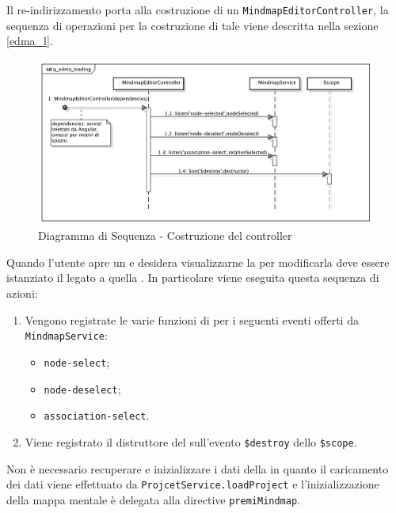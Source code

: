 Il re-indirizzamento porta alla costruzione di un \texttt{MindmapEditorController}, la sequenza di operazioni per la costruzione di tale  viene descritta nella sezione \ref{edma_l}.
\label{edma_l}
\begin{center}
\begin{figure}[h]
\centering
\includegraphics[scale=0.25,keepaspectratio]{diagrammi/sequenza/FrontEnd/controllers/q_edma_loading.pdf}
\caption{Diagramma di Sequenza - Costruzione del controller}
\end{figure}
\end{center}
\FloatBarrier
Quando l'utente apre un  e desidera visualizzarne la  per modificarla deve essere istanziato il  legato a quella . In particolare viene eseguita questa sequenza di azioni:
\begin{enumerate}
\item Vengono registrate le varie funzioni di  per i seguenti eventi offerti da \texttt{MindmapService}:
\begin{itemize}
\item \texttt{node-select};
\item \texttt{node-deselect};
\item \texttt{association-select}.
\end{itemize}
\item Viene registrato il distruttore del  sull'evento \texttt{\$destroy} dello \texttt{\$scope}.
\end{enumerate}
Non è necessario recuperare e inizializzare i dati della  in quanto il caricamento dei dati viene effettuato da \texttt{ProjcetService.loadProject} e l'inizializzazione della mappa mentale è delegata alla directive \texttt{premiMindmap}.
\label{emc}
